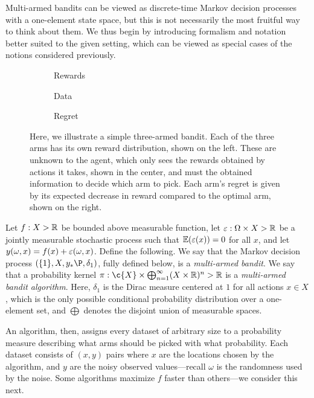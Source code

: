 \documentclass[11pt]{book}
\begin{document}
Multi-armed bandits can be viewed as discrete-time Markov decision processes with a one-element state space, but this is not necessarily the most fruitful way to think about them.
We thus begin by introducing formalism and notation better suited to the given setting, which can be viewed as special cases of the notions considered previously.

\begin{figure}
\begin{subfigure}{0.3\textwidth}

\caption{Rewards}
\end{subfigure}
\begin{subfigure}{0.3\textwidth}

\caption{Data}
\end{subfigure}
\begin{subfigure}{0.3\textwidth}

\caption{Regret}
\end{subfigure}
\caption{Here, we illustrate a simple three-armed bandit. 
Each of the three arms has its own reward distribution, shown on the left.
These are unknown to the agent, which only sees the rewards obtained by actions it takes, shown in the center, and must the obtained information to decide which arm to pick.
Each arm's regret is given by its expected decrease in reward compared to the optimal arm, shown on the right.}
\end{figure}

\begin{definition}
Let $f : X \-> \mathbb{R}$ be bounded above measurable function, let $\varepsilon : \Omega \times X \-> \mathbb{R}$ be a jointly measurable stochastic process such that $\operatorname{\mathbb{E}}(\varepsilon(x)) = 0$ for all $x$, and let $y(\omega,x) = f(x) + \varepsilon(\omega,x)$.
Define the following.
\1 We say that the Markov decision process $(\{1\},X,y_*\P,\delta_{1})$, fully defined below, is a \emph{multi-armed bandit}.
\2 We say that a probability kernel  $\pi : \c{X} \x \bigoplus_{n=1}^\infty (X \x \R)^n \-> \R$ is a \emph{multi-armed bandit algorithm}.
\0
Here, $\delta_1$ is the Dirac measure centered at $1$ for all actions $x\in X$, which is the only possible conditional probability distribution over a one-element set, and $\bigoplus$ denotes the disjoint union of measurable spaces.
\end{definition}

An algorithm, then, assigns every dataset of arbitrary size to a probability measure describing what arms should be picked with what probability.
Each dataset consists of $(x, y)$ pairs where $x$ are the locations chosen by the algorithm, and $y$ are the noisy observed values---recall $\omega$ is the randomness used by the noise.
Some algorithms maximize $f$ faster than others---we consider this next.
\end{document}
